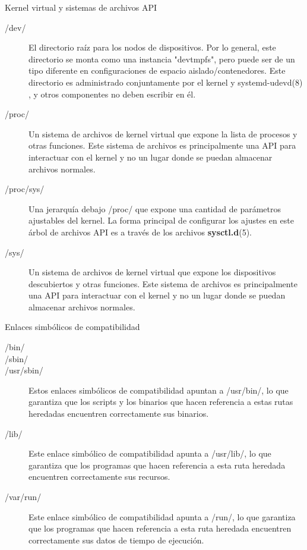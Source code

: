 \begin{frame}[c]{Kernel virtual y sistemas de archivos API}
  \begin{description}
    \item [/dev/] El directorio raíz para los nodos de dispositivos. Por lo
      general, este directorio se monta como una instancia "devtmpfs", pero
      puede ser de un tipo diferente en configuraciones de espacio
      aislado/contenedores. Este directorio es administrado conjuntamente por
      el kernel y systemd-udevd(8) , y otros componentes no deben escribir
      en él.
    \pausa
    \item [/proc/] Un sistema de archivos de kernel virtual que expone la
      lista de procesos y otras funciones. Este sistema de archivos es
      principalmente una API para interactuar con el kernel y no un lugar
      donde se puedan almacenar archivos normales.
    \pausa
    \item [/proc/sys/] Una jerarquía debajo /proc/ que expone una cantidad de
      parámetros ajustables del kernel. La forma principal de configurar los
      ajustes en este árbol de archivos API es a través de los archivos
      \textbf{sysctl.d}(5).
    \pausa
    \item [/sys/] Un sistema de archivos de kernel virtual que expone los
      dispositivos descubiertos y otras funciones. Este sistema de archivos es
      principalmente una API para interactuar con el kernel y no un lugar
      donde se puedan almacenar archivos normales.
  \end{description}
\end{frame}

\begin{frame}[c]{Enlaces simbólicos de compatibilidad}
  \begin{description}
    \item [/bin/]
    \item [/sbin/]
    \item [/usr/sbin/] Estos enlaces simbólicos de compatibilidad apuntan a
      /usr/bin/, lo que garantiza que los scripts y los binarios que hacen
      referencia a estas rutas heredadas encuentren correctamente sus binarios.
    \pausa
    \item [/lib/] Este enlace simbólico de compatibilidad apunta a
      /usr/lib/, lo que garantiza que los programas que hacen referencia a
      esta ruta heredada encuentren correctamente sus recursos.
    \pausa
    \item [/var/run/] Este enlace simbólico de compatibilidad apunta a /run/,
      lo que garantiza que los programas que hacen referencia a esta ruta
      heredada encuentren correctamente sus datos de tiempo de ejecución.
  \end{description}
\end{frame}
